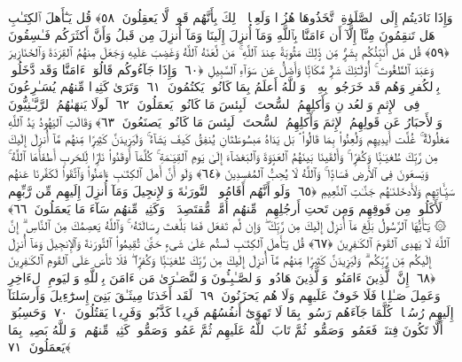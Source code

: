  وَإِذَا نَادَيتُم إِلَى ٱلصَّلَوٰةِ ٱتَّخَذُوهَا هُزُوًۭا وَلَعِبًۭا ۚ ذَٟلِكَ بِأَنَّهُم قَومٌۭ لَّا يَعقِلُونَ ﴿٥٨﴾
 قُل يَـٰٓأَهلَ ٱلكِتَـٰبِ هَل تَنقِمُونَ مِنَّآ إِلَّآ أَن ءَامَنَّا بِٱللَّهِ وَمَآ أُنزِلَ إِلَينَا وَمَآ أُنزِلَ مِن قَبلُ وَأَنَّ أَكثَرَكُم فَـٰسِقُونَ ﴿٥٩﴾
 قُل هَل أُنَبِّئُكُم بِشَرٍّۢ مِّن ذَٟلِكَ مَثُوبَةً عِندَ ٱللَّهِ ۚ مَن لَّعَنَهُ ٱللَّهُ وَغَضِبَ عَلَيهِ وَجَعَلَ مِنهُمُ ٱلقِرَدَةَ وَٱلخَنَازِيرَ وَعَبَدَ ٱلطَّٰغُوتَ ۚ أُو۟لَـٰٓئِكَ شَرٌّۭ مَّكَانًۭا وَأَضَلُّ عَن سَوَآءِ ٱلسَّبِيلِ ﴿٦٠﴾
 وَإِذَا جَآءُوكُم قَالُوٓا۟ ءَامَنَّا وَقَد دَّخَلُوا۟ بِٱلكُفرِ وَهُم قَد خَرَجُوا۟ بِهِۦ ۚ وَٱللَّهُ أَعلَمُ بِمَا كَانُوا۟ يَكتُمُونَ ﴿٦١﴾
 وَتَرَىٰ كَثِيرًۭا مِّنهُم يُسَـٰرِعُونَ فِى ٱلإِثمِ وَٱلعُدوَٟنِ وَأَكلِهِمُ ٱلسُّحتَ ۚ لَبِئسَ مَا كَانُوا۟ يَعمَلُونَ ﴿٦٢﴾
 لَولَا يَنهَىٰهُمُ ٱلرَّبَّـٰنِيُّونَ وَٱلأَحبَارُ عَن قَولِهِمُ ٱلإِثمَ وَأَكلِهِمُ ٱلسُّحتَ ۚ لَبِئسَ مَا كَانُوا۟ يَصنَعُونَ ﴿٦٣﴾
 وَقَالَتِ ٱليَهُودُ يَدُ ٱللَّهِ مَغلُولَةٌ ۚ غُلَّت أَيدِيهِم وَلُعِنُوا۟ بِمَا قَالُوا۟ ۘ بَل يَدَاهُ مَبسُوطَتَانِ يُنفِقُ كَيفَ يَشَآءُ ۚ وَلَيَزِيدَنَّ كَثِيرًۭا مِّنهُم مَّآ أُنزِلَ إِلَيكَ مِن رَّبِّكَ طُغيَـٰنًۭا وَكُفرًۭا ۚ وَأَلقَينَا بَينَهُمُ ٱلعَدَٟوَةَ وَٱلبَغضَآءَ إِلَىٰ يَومِ ٱلقِيَـٰمَةِ ۚ كُلَّمَآ أَوقَدُوا۟ نَارًۭا لِّلحَربِ أَطفَأَهَا ٱللَّهُ ۚ وَيَسعَونَ فِى ٱلأَرضِ فَسَادًۭا ۚ وَٱللَّهُ لَا يُحِبُّ ٱلمُفسِدِينَ ﴿٦٤﴾
 وَلَو أَنَّ أَهلَ ٱلكِتَـٰبِ ءَامَنُوا۟ وَٱتَّقَوا۟ لَكَفَّرنَا عَنهُم سَيِّـَٔاتِهِم وَلَأَدخَلنَـٰهُم جَنَّـٰتِ ٱلنَّعِيمِ ﴿٦٥﴾
 وَلَو أَنَّهُم أَقَامُوا۟ ٱلتَّورَىٰةَ وَٱلإِنجِيلَ وَمَآ أُنزِلَ إِلَيهِم مِّن رَّبِّهِم لَأَكَلُوا۟ مِن فَوقِهِم وَمِن تَحتِ أَرجُلِهِم ۚ مِّنهُم أُمَّةٌۭ مُّقتَصِدَةٌۭ ۖ وَكَثِيرٌۭ مِّنهُم سَآءَ مَا يَعمَلُونَ ﴿٦٦﴾
 ۞ يَـٰٓأَيُّهَا ٱلرَّسُولُ بَلِّغ مَآ أُنزِلَ إِلَيكَ مِن رَّبِّكَ ۖ وَإِن لَّم تَفعَل فَمَا بَلَّغتَ رِسَالَتَهُۥ ۚ وَٱللَّهُ يَعصِمُكَ مِنَ ٱلنَّاسِ ۗ إِنَّ ٱللَّهَ لَا يَهدِى ٱلقَومَ ٱلكَـٰفِرِينَ ﴿٦٧﴾
 قُل يَـٰٓأَهلَ ٱلكِتَـٰبِ لَستُم عَلَىٰ شَىءٍ حَتَّىٰ تُقِيمُوا۟ ٱلتَّورَىٰةَ وَٱلإِنجِيلَ وَمَآ أُنزِلَ إِلَيكُم مِّن رَّبِّكُم ۗ وَلَيَزِيدَنَّ كَثِيرًۭا مِّنهُم مَّآ أُنزِلَ إِلَيكَ مِن رَّبِّكَ طُغيَـٰنًۭا وَكُفرًۭا ۖ فَلَا تَأسَ عَلَى ٱلقَومِ ٱلكَـٰفِرِينَ ﴿٦٨﴾
 إِنَّ ٱلَّذِينَ ءَامَنُوا۟ وَٱلَّذِينَ هَادُوا۟ وَٱلصَّـٰبِـُٔونَ وَٱلنَّصَـٰرَىٰ مَن ءَامَنَ بِٱللَّهِ وَٱليَومِ ٱلءَاخِرِ وَعَمِلَ صَـٰلِحًۭا فَلَا خَوفٌ عَلَيهِم وَلَا هُم يَحزَنُونَ ﴿٦٩﴾
 لَقَد أَخَذنَا مِيثَـٰقَ بَنِىٓ إِسرَٰٓءِيلَ وَأَرسَلنَآ إِلَيهِم رُسُلًۭا ۖ كُلَّمَا جَآءَهُم رَسُولٌۢ بِمَا لَا تَهوَىٰٓ أَنفُسُهُم فَرِيقًۭا كَذَّبُوا۟ وَفَرِيقًۭا يَقتُلُونَ ﴿٧٠﴾
 وَحَسِبُوٓا۟ أَلَّا تَكُونَ فِتنَةٌۭ فَعَمُوا۟ وَصَمُّوا۟ ثُمَّ تَابَ ٱللَّهُ عَلَيهِم ثُمَّ عَمُوا۟ وَصَمُّوا۟ كَثِيرٌۭ مِّنهُم ۚ وَٱللَّهُ بَصِيرٌۢ بِمَا يَعمَلُونَ ﴿٧١﴾
